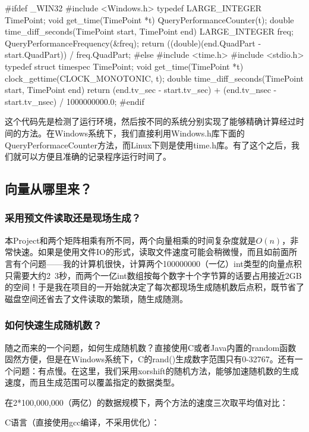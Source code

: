 \documentclass[11pt]{article}
\begin{document}
\begin{codeline}
#ifdef _WIN32
    #include <Windows.h>
    typedef LARGE_INTEGER TimePoint;
    void get_time(TimePoint *t) {
        QueryPerformanceCounter(t);
    }
    double time_diff_seconds(TimePoint start, TimePoint end) {
        LARGE_INTEGER freq;
        QueryPerformanceFrequency(&freq);
        return ((double)(end.QuadPart - start.QuadPart)) / freq.QuadPart;
    }
#else
    #include <time.h>
    #include <stdio.h>
    typedef struct timespec TimePoint;
    void get_time(TimePoint *t) {
        clock_gettime(CLOCK_MONOTONIC, t);
    }
    double time_diff_seconds(TimePoint start, TimePoint end) {
        return (end.tv_sec - start.tv_sec) + 
               (end.tv_nsec - start.tv_nsec) / 1000000000.0;
    }
#endif
\end{codeline}
这个代码先是检测了运行环境，然后按不同的系统分别实现了能够精确计算经过时间的方法。在Windows系统下，我们直接利用Windows.h库下面的QueryPerformaceCounter方法，而Linux下则是使用time.h库。有了这个之后，我们就可以方便且准确的记录程序运行时间了。

\subsection{向量从哪里来？}
\subsubsection{采用预文件读取还是现场生成？}
本Project和两个矩阵相乘有所不同，两个向量相乘的时间复杂度就是$O(n)$，非常快速。如果是使用文件IO的形式，读取文件速度可能会稍微慢，而且如前面所言有个问题——我的计算机很快，计算两个100000000（一亿）int类型的向量点积只需要大约2~3秒，而两个一亿int数组按每个数字十个字节算的话要占用接近2GB的空间！于是我在项目的一开始就决定了每次都现场生成随机数后点积，既节省了磁盘空间还省去了文件读取的繁琐，随生成随测。

\subsubsection{如何快速生成随机数？}
随之而来的一个问题，如何生成随机数？直接使用C或者Java内置的random函数固然方便，但是在Windows系统下，C的rand()生成数字范围只有0-32767。还有一个问题：有点慢。在这里，我们采用xorshift的随机方法，能够加速随机数的生成速度，而且生成范围可以覆盖指定的数据类型。


在2*100,000,000（两亿）的数据规模下，两个方法的速度三次取平均值对比：


C语言（直接使用gcc编译，不采用优化）：
\end{document}
